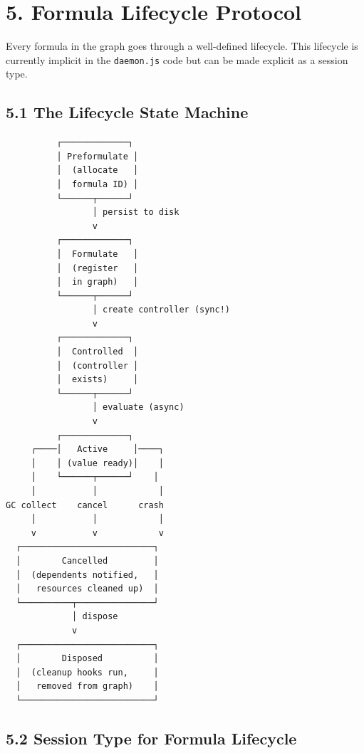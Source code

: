 \documentclass[11pt]{article}
\begin{document}
\section{5. Formula Lifecycle Protocol}
\label{sec:orga1e4f00}

Every formula in the graph goes through a well-defined lifecycle. This
lifecycle is currently implicit in the \texttt{daemon.js} code but can be made
explicit as a session type.
\subsection{5.1 The Lifecycle State Machine}
\label{sec:org55c060f}

\begin{verbatim}
          ┌─────────────┐
          │ Preformulate │
          │  (allocate   │
          │  formula ID) │
          └──────┬──────┘
                 │ persist to disk
                 v
          ┌─────────────┐
          │  Formulate   │
          │  (register   │
          │  in graph)   │
          └──────┬──────┘
                 │ create controller (sync!)
                 v
          ┌─────────────┐
          │  Controlled  │
          │  (controller │
          │  exists)     │
          └──────┬──────┘
                 │ evaluate (async)
                 v
          ┌─────────────┐
     ┌────│   Active     │────┐
     │    │ (value ready)│    │
     │    └──────┬──────┘    │
     │           │            │
GC collect    cancel      crash
     │           │            │
     v           v            v
  ┌──────────────────────────┐
  │        Cancelled         │
  │  (dependents notified,   │
  │   resources cleaned up)  │
  └──────────┬───────────────┘
             │ dispose
             v
  ┌──────────────────────────┐
  │        Disposed          │
  │  (cleanup hooks run,     │
  │   removed from graph)    │
  └──────────────────────────┘
\end{verbatim}
\subsection{5.2 Session Type for Formula Lifecycle}
\label{sec:orgeb4398c}
\end{document}

